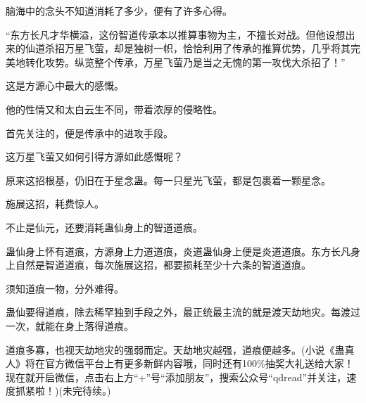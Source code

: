 \begin{this_body}
脑海中的念头不知道消耗了多少，便有了许多心得。

“东方长凡才华横溢，这份智道传承本以推算事物为主，不擅长对战。但他设想出来的仙道杀招万星飞萤，却是独树一帜，恰恰利用了传承的推算优势，几乎将其完美地转化攻势。纵览整个传承，万星飞萤乃是当之无愧的第一攻伐大杀招了！”

这是方源心中最大的感慨。

他的性情又和太白云生不同，带着浓厚的侵略性。

首先关注的，便是传承中的进攻手段。

这万星飞萤又如何引得方源如此感慨呢？

原来这招根基，仍旧在于星念蛊。每一只星光飞萤，都是包裹着一颗星念。

施展这招，耗费惊人。

不止是仙元，还要消耗蛊仙身上的智道道痕。

蛊仙身上怀有道痕，方源身上力道道痕，炎道蛊仙身上便是炎道道痕。东方长凡身上自然是智道道痕，每次施展这招，都要损耗至少十六条的智道道痕。

须知道痕一物，分外难得。

蛊仙要得道痕，除去稀罕独到手段之外，最正统最主流的就是渡天劫地灾。每渡过一次，就能在身上落得道痕。

道痕多寡，也视天劫地灾的强弱而定。天劫地灾越强，道痕便越多。(小说《蛊真人》将在官方微信平台上有更多新鲜内容哦，同时还有100\%抽奖大礼送给大家！现在就开启微信，点击右上方“+”号“添加朋友”，搜索公众号“qdread”并关注，速度抓紧啦！)(未完待续。)

\end{this_body}

